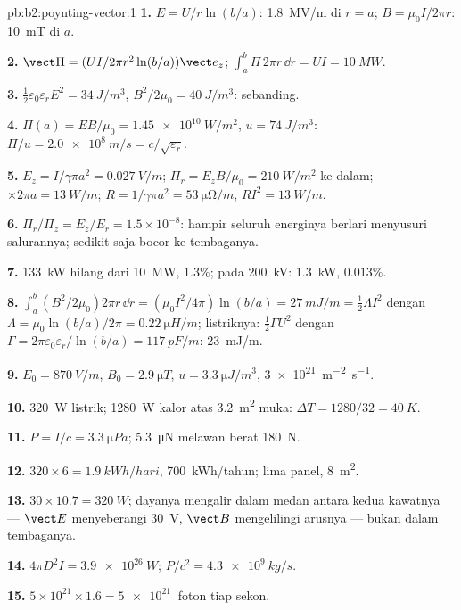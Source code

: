 \begin{solution}{pb:b2:poynting-vector:1}
\textbf{1.} $E = U/r\ln(b/a)$: \qty{1.8}{MV/m} di $r = a$; $B = \mu_0I/2\pi r$:
\qty{10}{mT} di $a$.

\textbf{2.} $\vect\Pi = (UI/2\pi r^2\ln(b/a))\vect e_z$; $\int_a^b\Pi\,2\pi r\,\dd r = UI =
\qty{10}{MW}$.

\textbf{3.} $\tfrac12\varepsilon_0\varepsilon_rE^2 = \qty{34}{J/m^3}$, $B^2/2\mu_0 = \qty{40}{J/m^3}$:
sebanding.

\textbf{4.} $\Pi(a) = EB/\mu_0 = \qty{1.45e10}{W/m^2}$, $u = \qty{74}{J/m^3}$: $\Pi/u =
\qty{2.0e8}{m/s} = c/\sqrt{\varepsilon_r}$.

\textbf{5.} $E_z = I/\gamma\pi a^2 = \qty{0.027}{V/m}$; $\Pi_r = E_zB/\mu_0 = \qty{210}{W/m^2}$
ke dalam; $\times2\pi a = \qty{13}{W/m}$; $R = 1/\gamma\pi a^2 = \qty{53}{\micro\ohm/m}$, $RI^2 =
\qty{13}{W/m}$.

\textbf{6.} $\Pi_r/\Pi_z = E_z/E_r = 1.5 \times 10^{-8}$: hampir seluruh energinya berlari
menyusuri salurannya; sedikit saja bocor ke tembaganya.

\textbf{7.} \qty{133}{kW} hilang dari \qty{10}{MW}, $1.3\%$; pada \qty{200}{kV}: \qty{1.3}{kW},
$0.013\%$.

\textbf{8.} $\int_a^b(B^2/2\mu_0)2\pi r\,\dd r = (\mu_0I^2/4\pi)\ln(b/a) = \qty{27}{mJ/m} =
\tfrac12\Lambda I^2$ dengan $\Lambda = \mu_0\ln(b/a)/2\pi = \qty{0.22}{\micro H/m}$; listriknya:
$\tfrac12\Gamma U^2$ dengan $\Gamma = 2\pi\varepsilon_0\varepsilon_r/\ln(b/a) = \qty{117}{pF/m}$: \qty{23}{mJ/m}.

\textbf{9.} $E_0 = \qty{870}{V/m}$, $B_0 = \qty{2.9}{\micro T}$, $u = \qty{3.3}{\micro J/m^3}$,
\qty{3e21}{m^{-2}.s^{-1}}.

\textbf{10.} \qty{320}{W} listrik; \qty{1280}{W} kalor atas \qty{3.2}{m^2}
muka: $\Delta T = 1280/32 = \qty{40}{K}$.

\textbf{11.} $P = I/c = \qty{3.3}{\micro Pa}$; \qty{5.3}{\micro N} melawan berat
\qty{180}{N}.

\textbf{12.} $320 \times 6 = \qty{1.9}{kWh/hari}$, \qty{700}{kWh/tahun}; lima panel,
\qty{8}{m^2}.

\textbf{13.} $30 \times 10.7 = \qty{320}{W}$; dayanya mengalir dalam medan antara
kedua kawatnya --- $\vect E$ menyeberangi \qty{30}{V}, $\vect B$ mengelilingi arusnya ---
bukan dalam tembaganya.

\textbf{14.} $4\pi D^2I = \qty{3.9e26}{W}$; $P/c^2 = \qty{4.3e9}{kg/s}$.

\textbf{15.} $5 \times 10^{21} \times 1.6 = \qty{5e21}{}$ foton tiap sekon.


\end{solution}
